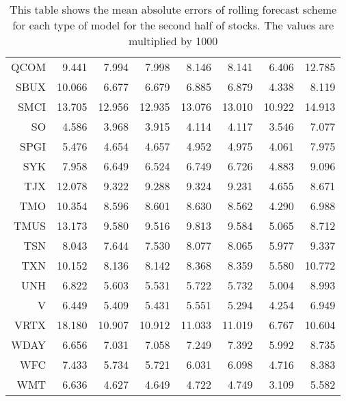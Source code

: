 \begin{table}[ht]
\begin{tabular}{rrrrrrrr}
  QCOM & 9.441 & 7.994 & 7.998 & 8.146 & 8.141 & 6.406 & 12.785 \\ 
  SBUX & 10.066 & 6.677 & 6.679 & 6.885 & 6.879 & 4.338 & 8.119 \\ 
  SMCI & 13.705 & 12.956 & 12.935 & 13.076 & 13.010 & 10.922 & 14.913 \\ 
  SO & 4.586 & 3.968 & 3.915 & 4.114 & 4.117 & 3.546 & 7.077 \\ 
  SPGI & 5.476 & 4.654 & 4.657 & 4.952 & 4.975 & 4.061 & 7.975 \\ 
  SYK & 7.958 & 6.649 & 6.524 & 6.749 & 6.726 & 4.883 & 9.096 \\ 
  TJX & 12.078 & 9.322 & 9.288 & 9.324 & 9.231 & 4.655 & 8.671 \\ 
  TMO & 10.354 & 8.596 & 8.601 & 8.630 & 8.562 & 4.290 & 6.988 \\ 
  TMUS & 13.173 & 9.580 & 9.516 & 9.813 & 9.584 & 5.065 & 8.712 \\ 
  TSN & 8.043 & 7.644 & 7.530 & 8.077 & 8.065 & 5.977 & 9.337 \\ 
  TXN & 10.152 & 8.136 & 8.142 & 8.368 & 8.359 & 5.580 & 10.772 \\ 
  UNH & 6.822 & 5.603 & 5.531 & 5.722 & 5.732 & 5.004 & 8.993 \\ 
  V & 6.449 & 5.409 & 5.431 & 5.551 & 5.294 & 4.254 & 6.949 \\ 
  VRTX & 18.180 & 10.907 & 10.912 & 11.033 & 11.019 & 6.767 & 10.604 \\ 
  WDAY & 6.656 & 7.031 & 7.058 & 7.249 & 7.392 & 5.992 & 8.735 \\ 
  WFC & 7.433 & 5.734 & 5.721 & 6.031 & 6.098 & 4.716 & 8.383 \\ 
  WMT & 6.636 & 4.627 & 4.649 & 4.722 & 4.749 & 3.109 & 5.582 \\ 
   \hline
\end{tabular}
\caption[MAE rolling forecast (2)]{This table shows the mean absolute errors of rolling forecast scheme for each type of model for the second half of stocks. 
                     The values are multiplied by 1000} 
\label{Table:MAE_r_2}
\end{table}
